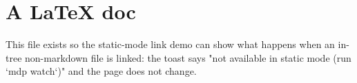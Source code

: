 \section{A LaTeX doc}

This file exists so the static-mode link demo can show what happens
when an in-tree non-markdown file is linked: the toast says "not
available in static mode (run `mdp watch`)" and the page does not
change.
